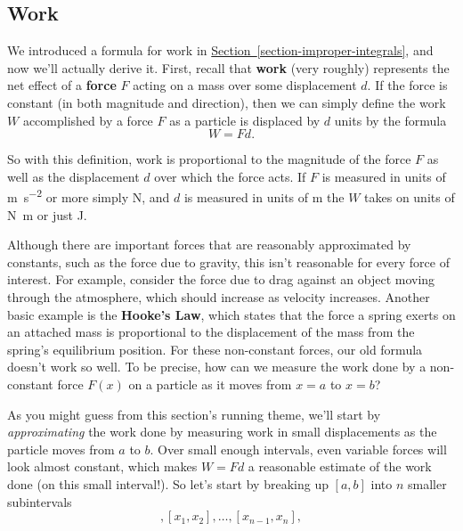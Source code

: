 \documentclass[10pt,]{book}
\newcommand{\terminology}[1]{\textbf{#1}}
\numberwithin{equation}{section}
\begin{document}
\subsection[{Work}]{Work}\label{subsection-work}
\hypertarget{p-680}{}%
We introduced a formula for work in \hyperref[section-improper-integrals]{Section~\ref{section-improper-integrals}}, and now we'll actually derive it. First, recall that \terminology{work} (very roughly) represents the net effect of a \terminology{force} \(F\) acting on a mass over some displacement \(d\). If the force is constant (in both magnitude and direction), then we can simply define the work \(W\) accomplished by a force \(F\) as a particle is displaced by \(d\) units by the formula%
\begin{equation*}
W = Fd.
\end{equation*}
%
\par
\hypertarget{p-681}{}%
So with this definition, work is proportional to the magnitude of the force \(F\) as well as the displacement \(d\) over which the force acts. If \(F\) is measured in units of \si{\meter\per\second\tothe{2}} or more simply \si{\newton}, and \(d\) is measured in units of \si{\meter} the \(W\) takes on units of \si{\newton\meter} or just \si{\joule}.%
\par
\hypertarget{p-682}{}%
Although there are important forces that are reasonably approximated by constants, such as the force due to gravity, this isn't reasonable for every force of interest. For example, consider the force due to drag against an object moving through the atmosphere, which should increase as velocity increases. Another basic example is the \terminology{Hooke's Law}, which states that the force a spring exerts on an attached mass is proportional to the displacement of the mass from the spring's equilibrium position. For these non-constant forces, our old formula doesn't work so well. To be precise, how can we measure the work done by a non-constant force \(F(x)\) on a particle as it moves from \(x = a\) to \(x = b\)?%
\par
\hypertarget{p-683}{}%
As you might guess from this section's running theme, we'll start by \emph{approximating} the work done by measuring work in small displacements as the particle moves from \(a\) to \(b\). Over small enough intervals, even variable forces will look almost constant, which makes \(W = Fd\) a reasonable estimate of the work done (on this small interval!). So let's start by breaking up \([a,b]\) into \(n\) smaller subintervals%
\begin{equation*}
[x_{0}, x_{1}], [x_{1}, x_{2}], \ldots, [x_{n-1}, x_{n}],
\end{equation*}
\end{document}
